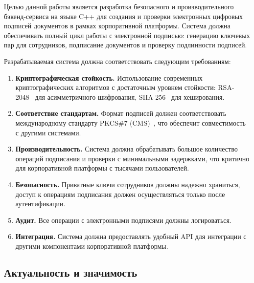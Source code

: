 \documentclass[a4paper,12pt]{extarticle}
\begin{document}
Целью данной работы является разработка безопасного и производительного бэкенд-сервиса на языке C++ для создания и проверки электронных цифровых подписей документов в рамках корпоративной платформы. Система должна обеспечивать полный цикл работы с электронной подписью: генерацию ключевых пар для сотрудников, подписание документов и проверку подлинности подписей.

Разрабатываемая система должна соответствовать следующим требованиям:

\begin{enumerate}
    \item \textbf{Криптографическая стойкость.} Использование современных криптографических алгоритмов с достаточным уровнем стойкости: RSA-2048~\cite{rivest1978,rfc3447} для асимметричного шифрования, SHA-256~\cite{sha256} для хеширования.

    \item \textbf{Соответствие стандартам.} Формат подписей должен соответствовать международному стандарту PKCS\#7 (CMS)~\cite{pkcs7,rfc5652}, что обеспечит совместимость с другими системами.

    \item \textbf{Производительность.} Система должна обрабатывать большое количество операций подписания и проверки с минимальными задержками, что критично для корпоративной платформы с тысячами пользователей.

    \item \textbf{Безопасность.} Приватные ключи сотрудников должны надежно храниться, доступ к операциям подписания должен осуществляться только после аутентификации.

    \item \textbf{Аудит.} Все операции с электронными подписями должны логироваться.

    \item \textbf{Интеграция.} Система должна предоставлять удобный API для интеграции с другими компонентами корпоративной платформы.
\end{enumerate}

\subsection{Актуальность и значимость}
\end{document}
